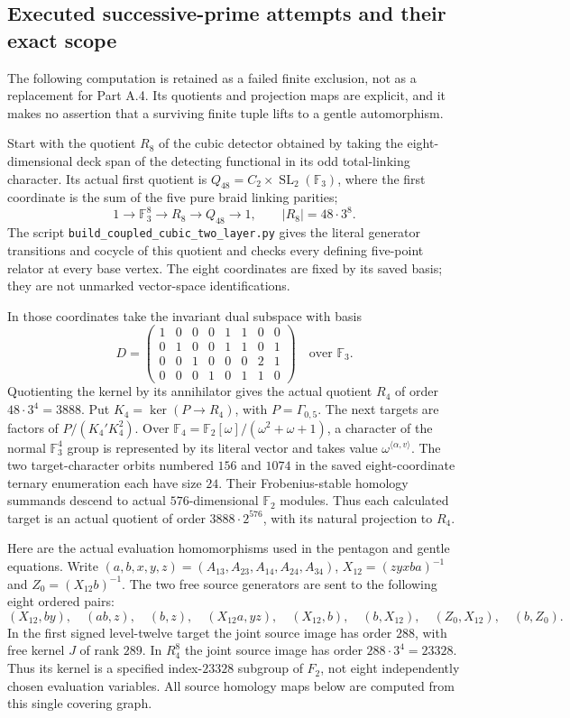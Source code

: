 \subsection{Executed successive-prime attempts and their exact scope}

The following computation is retained as a failed finite exclusion,
not as a replacement for Part A.4.  Its quotients and projection
maps are explicit, and it makes no assertion that a surviving
finite tuple lifts to a gentle automorphism.

Start with the quotient $R_8$ of the cubic detector obtained by
taking the eight-dimensional deck span of the detecting functional
in its odd total-linking character.  Its actual first quotient is
$Q_{48}=C_2\times\operatorname{SL}_2(\mathbb F_3)$, where the first
coordinate is the sum of the five pure braid linking parities;
\[
 1\longrightarrow\mathbb F_3^8\longrightarrow R_8
   \longrightarrow Q_{48}\longrightarrow1,
 \qquad |R_8|=48\cdot3^8.
\]
The script \texttt{build\_coupled\_cubic\_two\_layer.py} gives the
literal generator transitions and cocycle of this quotient and
checks every defining five-point relator at every base vertex.
The eight coordinates are fixed by its saved basis; they are not
unmarked vector-space identifications.

In those coordinates take the invariant dual subspace with basis
\[
 D=\begin{pmatrix}
 1&0&0&0&1&1&0&0\\
 0&1&0&0&1&1&0&1\\
 0&0&1&0&0&0&2&1\\
 0&0&0&1&0&1&1&0
 \end{pmatrix}\quad\text{over }\mathbb F_3.
\]
Quotienting the kernel by its annihilator gives the actual quotient
$R_4$ of order $48\cdot3^4=3888$.  Put
$K_4=\ker(P\to R_4)$, with $P=\Gamma_{0,5}$.
The next targets are factors of $P/(K_4'K_4^2)$.
Over $\mathbb F_4=\mathbb F_2[\omega]/(\omega^2+\omega+1)$, a
character of the normal $\mathbb F_3^4$ group is represented by its
literal vector and takes value $\omega^{\langle\alpha,v\rangle}$.
The two target-character orbits numbered $156$ and $1074$ in the
saved eight-coordinate ternary enumeration each have size $24$.
Their Frobenius-stable homology summands descend to actual
$576$-dimensional $\mathbb F_2$ modules.  Thus each calculated target
is an actual quotient of order $3888\cdot2^{576}$, with its natural
projection to $R_4$.

Here are the actual evaluation homomorphisms used in the pentagon
and gentle equations.  Write
$(a,b,x,y,z)=(A_{13},A_{23},A_{14},A_{24},A_{34})$,
$X_{12}=(z y x b a)^{-1}$ and $Z_0=(X_{12}b)^{-1}$.
The two free source generators are sent to the following eight
ordered pairs:
\[
 (X_{12},by),\quad (ab,z),\quad (b,z),\quad
 (X_{12}a,yz),\quad (X_{12},b),\quad(b,X_{12}),\quad
 (Z_0,X_{12}),\quad(b,Z_0).
\]
In the first signed level-twelve target the joint source image has
order $288$, with free kernel $J$ of rank $289$.  In $R_4^8$ the
joint source image has order $288\cdot3^4=23328$.  Thus its kernel
is a specified index-$23328$ subgroup of $F_2$, not eight independently
chosen evaluation variables.  All source homology maps below are
computed from this single covering graph.

